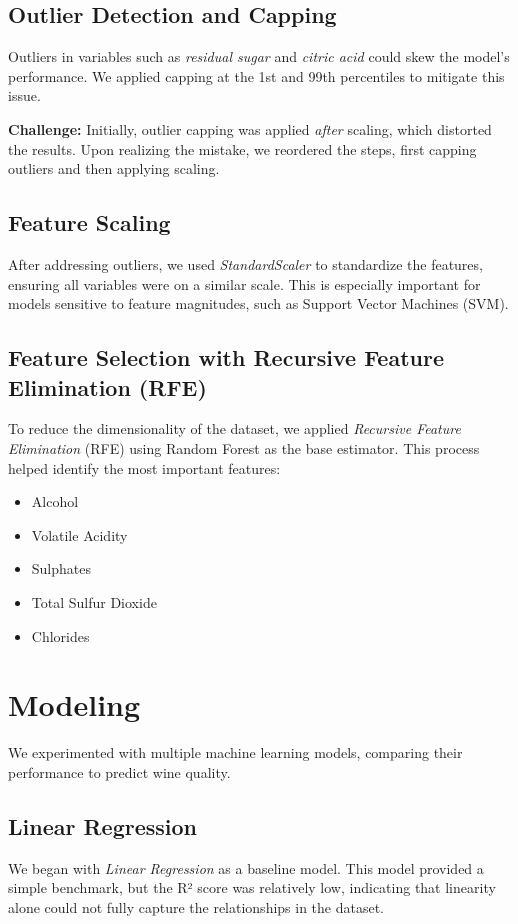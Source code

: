 \documentclass{article}
\begin{document}
\subsection{Outlier Detection and Capping}
Outliers in variables such as \textit{residual sugar} and \textit{citric acid} could skew the model's performance. We applied capping at the 1st and 99th percentiles to mitigate this issue.

\textbf{Challenge:} Initially, outlier capping was applied \textit{after} scaling, which distorted the results. Upon realizing the mistake, we reordered the steps, first capping outliers and then applying scaling.

\subsection{Feature Scaling}
After addressing outliers, we used \textit{StandardScaler} to standardize the features, ensuring all variables were on a similar scale. This is especially important for models sensitive to feature magnitudes, such as Support Vector Machines (SVM).

\subsection{Feature Selection with Recursive Feature Elimination (RFE)}
To reduce the dimensionality of the dataset, we applied \textit{Recursive Feature Elimination} (RFE) using Random Forest as the base estimator. This process helped identify the most important features:
\begin{itemize}
    \item Alcohol
    \item Volatile Acidity
    \item Sulphates
    \item Total Sulfur Dioxide
    \item Chlorides
\end{itemize}

\section{Modeling}
We experimented with multiple machine learning models, comparing their performance to predict wine quality.

\subsection{Linear Regression}
We began with \textit{Linear Regression} as a baseline model. This model provided a simple benchmark, but the R² score was relatively low, indicating that linearity alone could not fully capture the relationships in the dataset.
\end{document}
